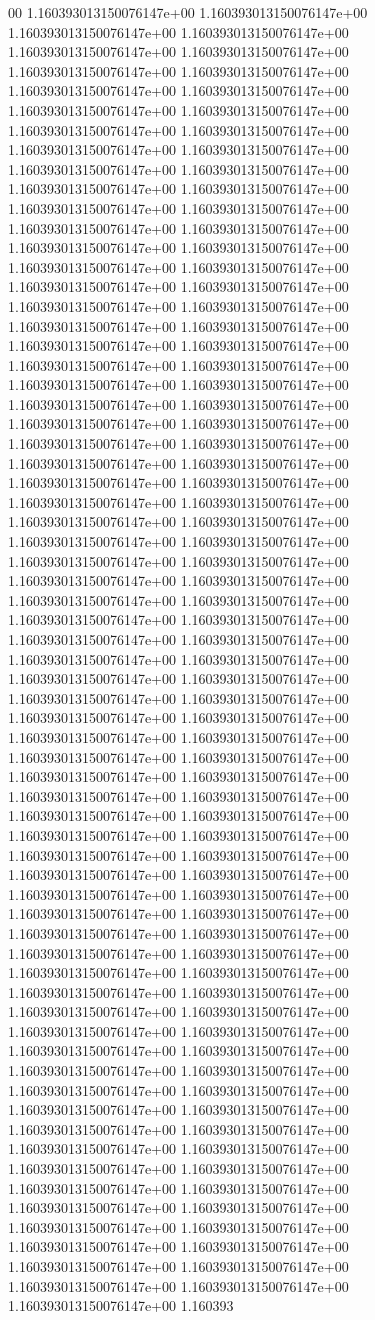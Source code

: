 00	1.160393013150076147e+00	1.160393013150076147e+00	1.160393013150076147e+00	1.160393013150076147e+00	1.160393013150076147e+00	1.160393013150076147e+00	1.160393013150076147e+00	1.160393013150076147e+00	1.160393013150076147e+00	1.160393013150076147e+00	1.160393013150076147e+00	1.160393013150076147e+00	1.160393013150076147e+00	1.160393013150076147e+00	1.160393013150076147e+00	1.160393013150076147e+00	1.160393013150076147e+00	1.160393013150076147e+00	1.160393013150076147e+00	1.160393013150076147e+00	1.160393013150076147e+00	1.160393013150076147e+00	1.160393013150076147e+00	1.160393013150076147e+00	1.160393013150076147e+00	1.160393013150076147e+00	1.160393013150076147e+00	1.160393013150076147e+00	1.160393013150076147e+00	1.160393013150076147e+00	1.160393013150076147e+00	1.160393013150076147e+00	1.160393013150076147e+00	1.160393013150076147e+00	1.160393013150076147e+00	1.160393013150076147e+00	1.160393013150076147e+00	1.160393013150076147e+00	1.160393013150076147e+00	1.160393013150076147e+00	1.160393013150076147e+00	1.160393013150076147e+00	1.160393013150076147e+00	1.160393013150076147e+00	1.160393013150076147e+00	1.160393013150076147e+00	1.160393013150076147e+00	1.160393013150076147e+00	1.160393013150076147e+00	1.160393013150076147e+00	1.160393013150076147e+00	1.160393013150076147e+00	1.160393013150076147e+00	1.160393013150076147e+00	1.160393013150076147e+00	1.160393013150076147e+00	1.160393013150076147e+00	1.160393013150076147e+00	1.160393013150076147e+00	1.160393013150076147e+00	1.160393013150076147e+00	1.160393013150076147e+00	1.160393013150076147e+00	1.160393013150076147e+00	1.160393013150076147e+00	1.160393013150076147e+00	1.160393013150076147e+00	1.160393013150076147e+00	1.160393013150076147e+00	1.160393013150076147e+00	1.160393013150076147e+00	1.160393013150076147e+00	1.160393013150076147e+00	1.160393013150076147e+00	1.160393013150076147e+00	1.160393013150076147e+00	1.160393013150076147e+00	1.160393013150076147e+00	1.160393013150076147e+00	1.160393013150076147e+00	1.160393013150076147e+00	1.160393013150076147e+00	1.160393013150076147e+00	1.160393013150076147e+00	1.160393013150076147e+00	1.160393013150076147e+00	1.160393013150076147e+00	1.160393013150076147e+00	1.160393013150076147e+00	1.160393013150076147e+00	1.160393013150076147e+00	1.160393013150076147e+00	1.160393013150076147e+00	1.160393013150076147e+00	1.160393013150076147e+00	1.160393013150076147e+00	1.160393013150076147e+00	1.160393013150076147e+00	1.160393013150076147e+00	1.160393013150076147e+00	1.160393013150076147e+00	1.160393013150076147e+00	1.160393013150076147e+00	1.160393013150076147e+00	1.160393013150076147e+00	1.160393013150076147e+00	1.160393013150076147e+00	1.160393013150076147e+00	1.160393013150076147e+00	1.160393013150076147e+00	1.160393013150076147e+00	1.160393013150076147e+00	1.160393013150076147e+00	1.160393013150076147e+00	1.160393013150076147e+00	1.160393013150076147e+00	1.160393013150076147e+00	1.160393013150076147e+00	1.160393013150076147e+00	1.160393013150076147e+00	1.160393013150076147e+00	1.160393013150076147e+00	1.160393013150076147e+00	1.160393013150076147e+00	1.160393013150076147e+00	1.160393013150076147e+00	1.160393013150076147e+00	1.160393013150076147e+00	1.160393013150076147e+00	1.160393013150076147e+00	1.160393013150076147e+00	1.160393013150076147e+00	1.160393013150076147e+00	1.160393